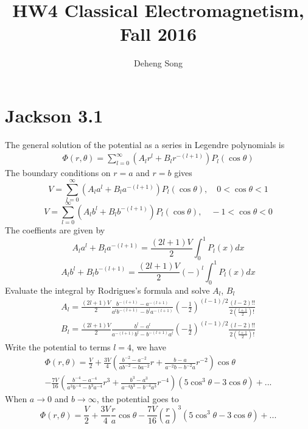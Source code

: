 \documentclass{article}
\begin{document}
\title{HW4 Classical Electromagnetism, Fall 2016}
\author{Deheng Song}
\maketitle
\section*{Jackson 3.1}

The general solution of the potential as a series in Legendre polynomials is
\begin{align*}
  \Phi(r,\theta)=\sum^\infty_{l=0}(A_l r^l+B_l r^{-(l+1)})P_l(\cos\theta)
\end{align*}
The boundary conditions on $r=a$ and $r=b$ gives
\[ V=\sum^\infty_{l=0}(A_l a^l+B_l a^{-(l+1)})P_l(\cos\theta),\quad 0<\cos\theta<1 \]
\[ V=\sum^\infty_{l=0}(A_l b^l+B_l b^{-(l+1)})P_l(\cos\theta),\quad -1<\cos\theta<0 \]
The coeffients are given by
\[ A_l a^l+ B_l a^{-(l+1)}= \frac{(2l+1)V}{2}\int_0^1P_l(x)dx \]
\[ A_l b^l +B_l b^{-(l+1)}=\frac{(2l+1)V}{2}(-)^l \int_0^1 P_l(x)dx \]
Evaluate the integral by Rodrigues's formula and solve $A_l$, $B_l$
\begin{align*}
   A_l =\frac{(2l+1)V}{2}\frac{b^{-(l+1)}-a^{-(l+1)}}{a^l b^{-(l+1)}- b^l a^{-(l+1)}}(-\frac 12)^{(l-1)/2}\frac{(l-2)!!}{2(\frac{l+1}{2})!} 
\end{align*}
\begin{align*}
  B_l=\frac{(2l+1)V}{2}\frac{b^l-a^l}{a^{-(l+1)}b^l-b^{-(l+1)}a^l}(-\frac 12)^{(l-1)/2}\frac{(l-2)!!}{2(\frac{l+1}{2})!}
\end{align*}
Write the potential to terms $l=4$, we have
\begin{align*}
  \Phi(r,\theta)=\frac{V}{2}+\frac{3V}{4}(\frac{b^{-2}-a^{-2}}{ab^{-2}-ba^{-2}}r+\frac{b-a}{a^{-2}b-b^{-2}a}r^{-2})\cos\theta\\-\frac{7V}{16}(\frac{b^{-4}-a^{-4}}{a^3b^{-4}-b^3a^{-4}}r^3+\frac{b^3-a^3}{a^{-4}b^{3}-b^{-4}a^3}r^{-4})(5\cos^3\theta-3\cos\theta)+...
\end{align*}
When $a\rightarrow 0$ and $b\rightarrow\infty$, the potential goes to
\[ \boxed{\Phi(r,\theta)=\frac{V}{2}+\frac{3V}{4}\frac{r}{a}\cos\theta-\frac{7V}{16}(\frac{r}{a})^3(5\cos^3\theta-3\cos\theta)+...}\]
\pagebreak
\end{document}
